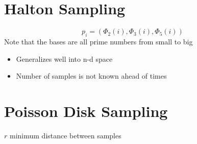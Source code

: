 \section{Halton Sampling}

  \begin{equation}
    p_{i} =
    \left(
      \Phi_{2} \left( i \right),
      \Phi_{3} \left( i \right),
      \Phi_{5} \left( i \right)
    \right)
  \end{equation}
  Note that the bases are all prime numbers from small to big

  \begin{itemize}
    \item Generalizes well into n-d space
    \item Number of samples is not known ahead of times
  \end{itemize}

\section{Poisson Disk Sampling}

  $ r $ minimum distance between samples

